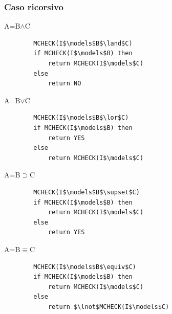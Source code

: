 \documentclass[../main.tex]{subfiles}
\begin{document}
    \subsubsection{Caso ricorsivo}
    A=B$\land$C
    \begin{lstlisting}
        MCHECK(I$\models$B$\land$C)
        if MCHECK(I$\models$B) then
            return MCHECK(I$\models$C)
        else
            return NO
    \end{lstlisting}

    \noindent
    A=B$\lor$C
    \begin{lstlisting}
        MCHECK(I$\models$B$\lor$C)
        if MCHECK(I$\models$B) then
            return YES
        else
            return MCHECK(I$\models$C)
    \end{lstlisting}

    \noindent
    A=B$\supset$C
    \begin{lstlisting}
        MCHECK(I$\models$B$\supset$C)
        if MCHECK(I$\models$B) then
            return MCHECK(I$\models$C)
        else
            return YES
    \end{lstlisting}

    \noindent
    A=B$\equiv$C
    \begin{lstlisting}
        MCHECK(I$\models$B$\equiv$C)
        if MCHECK(I$\models$B) then
            return MCHECK(I$\models$C)
        else
            return $\lnot$MCHECK(I$\models$C)
    \end{lstlisting}
\end{document}
